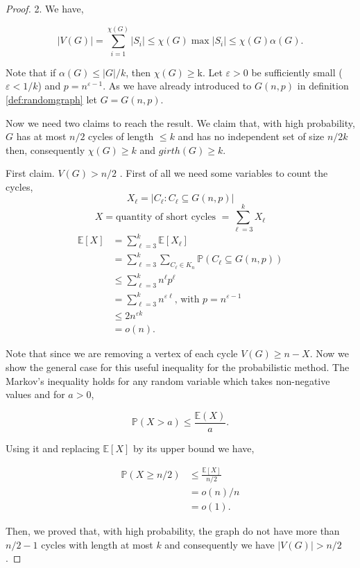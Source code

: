 \documentclass[12pt,twoside,a4paper,bibliography=totocnumbered]{book}
\numberwithin{equation}{section}
\theoremstyle{remark}
\begin{document}
\begin{proof}2.
We have,

$$ |V(G)| = \sum_{i=1}^{\chi(G)} |S_i| \leq \chi(G)\max|S_i| \leq \chi(G) \alpha (G) .$$

Note that if $\alpha(G) \leq |G|/k$, then $\chi(G) \geq $k. Let $\varepsilon > 0$ be sufficiently small ($\varepsilon < 1/k$) and $p = n^{\varepsilon - 1}$. As we have already introduced to $G(n,p)$ in definition \ref{def:randomgraph} let $G = G(n,p) $.%

Now we need two claims to reach the result. We claim that, with high probability, $G$ has at most $n/2$ cycles of length $\leq k$ and has no independent set  of size $n/2k$ then, consequently $\chi(G) \geq k$ and $girth(G) \geq k$.

First claim. $V(G) > n/2$ . First of all we need some variables to count the cycles,
$$X_{\ell} =  |C_{\ell} : C_{\ell} \subseteq G(n,p)|$$
$$X = \text{quantity of short cycles } = \sum_{{\ell}=3}^k X_{\ell}$$
\begin{align*}
\mathbb{E}[X] &= \sum_{{\ell}=3}^k \mathbb{E}[X_{\ell}] \\
	       &= \sum_{{\ell}=3}^k \sum_{C_{\ell} \in K_n} \mathbb{P}(C_{\ell} \subseteq G(n,p))\\
	       &\leq \sum_{{\ell}=3}^k n^{\ell} p^{\ell} \\
	       &= \sum_{{\ell}=3}^k n^{\varepsilon {\ell}}\text{, with } p= n^{\varepsilon - 1}\\
	       &\leq 2n^{\varepsilon k} \\
	       &= o(n).
\end{align*}

Note that since we are removing a vertex of each cycle $V(G) \geq n-X$. Now we show the general case for this useful inequality for the probabilistic method. The Markov's inequality holds for any random variable which takes non-negative values and for $a>0$,

$$\mathbb{P}(X>a) \leq \frac{\mathbb{E}(X)}{a}.$$

Using it and replacing $\mathbb{E}[X]$ by its upper bound we have,

\begin{align*}
\mathbb{P}(X\geq n/2) &\leq \frac{\mathbb{E}[X]}{n/2}\\
		& = o(n)/n\\
		& = o(1).
\end{align*}

Then, we proved that, with high probability, the graph do not have more than $n/2 -1$ cycles with length at most $k$ and consequently we have $|V(G)| > n/2$ .


\end{proof}
\end{document}
